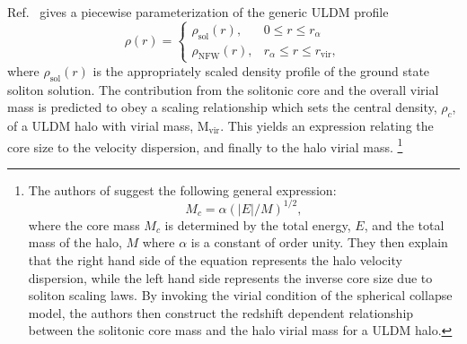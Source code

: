 \documentclass{pasa}%
\begin{document}
 
Ref.~\cite{Robles:2018fur} gives a piecewise parameterization of the generic ULDM profile 
%
\begin{equation}\label{eq:piecewise}
     \rho(r)=
    \begin{cases}
      \rho_{\mathrm{sol}}(r), & 0\leq r \leq r_{\alpha} \\
      \rho_\mathrm{NFW}(r), & r_{\alpha}\leq r \leq r_{\mathrm{vir}},
    \end{cases}
\end{equation}
%
where $\rho_{\mathrm{sol}}(r)$ is the appropriately scaled density profile of the ground state soliton solution. The contribution from the solitonic core and the overall virial mass is predicted to obey a scaling relationship \cite{Schive:2014hza, Chavanis:2019faf} which sets the central density, $\rho_c$, of a ULDM halo with virial mass, $\mathrm{M_{vir}}$. This yields an expression relating the core size to the velocity dispersion, and finally to the halo virial mass.%
\footnote{The authors of \cite{Schive:2014hza} suggest the following general expression:
\begin{equation}
    M_c = \alpha \left(\vert E\vert/M\right)^{1/2},
\end{equation}
where the core mass $M_c$ is determined by the total energy, $E$, and the total mass of the halo, $M$ where $\alpha$ is a constant of order unity. They then explain that the right hand side of the equation represents the halo velocity dispersion, while the left hand side  represents the inverse core size due to soliton scaling laws. By invoking the virial condition of the spherical collapse model, the authors then  construct the redshift dependent relationship between the solitonic core mass and the halo virial mass for a ULDM halo.}
\end{document}
